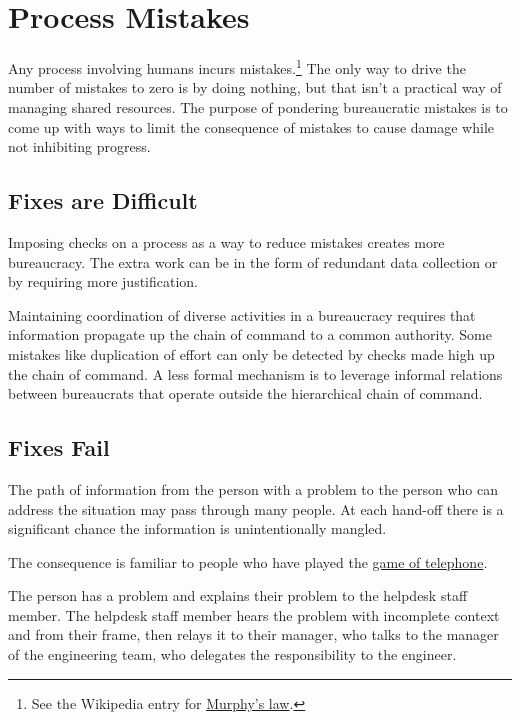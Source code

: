 \section{Process Mistakes\label{sec:process-mistakes}}

Any process involving humans incurs mistakes.\footnote{See the Wikipedia entry for \href{https://en.wikipedia.org/wiki/Murphy\%27s_law}{Murphy's law}.
} The only way to drive the number of mistakes to zero is by doing nothing, but that isn't a practical way of managing shared resources. 
The purpose of pondering bureaucratic mistakes is to come up with ways to limit the consequence of mistakes to cause damage while not inhibiting progress. 

\subsection*{Fixes are Difficult}
Imposing checks on a process as a way to  reduce mistakes creates more bureaucracy. The extra work can be in the form of redundant data collection or by requiring more justification. 

Maintaining coordination of diverse activities in a bureaucracy requires that information propagate up the chain of command to a common authority. Some mistakes like duplication of effort can only be detected by checks made high up the chain of command. A less formal mechanism is to leverage informal relations between bureaucrats that operate outside the hierarchical chain of command. 


\subsection*{Fixes Fail}
The path of information from the person with a problem to the person who can address the situation may pass through many people. At each hand-off there is a significant chance the information is unintentionally mangled. 

The consequence is familiar to people who have played the \href{https://en.wikipedia.org/wiki/Chinese_whispers\%23Game}{game of telephone}.
\begin{mdframed}[frametitle={Game of Telephone},frametitlerule=true,frametitlealignment=\centering]
The person has a problem and explains their problem to the helpdesk staff member. The helpdesk staff member hears the problem with incomplete context and from their frame, then relays it to their manager, who talks to the manager of the engineering team, who delegates the responsibility to the engineer. 
\end{mdframed}

